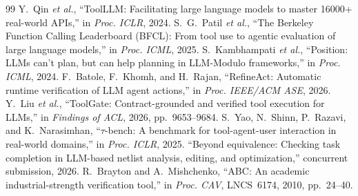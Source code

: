 \documentclass[conference,letterpaper]{IEEEtran}
\begin{document}
\begin{thebibliography}{99}
 Y.~Qin \emph{et al.}, ``ToolLLM: Facilitating large language models to master 16000+ real-world APIs,'' in \emph{Proc. ICLR}, 2024.
 S.~G.~Patil \emph{et al.}, ``The Berkeley Function Calling Leaderboard (BFCL): From tool use to agentic evaluation of large language models,'' in \emph{Proc. ICML}, 2025.
 S.~Kambhampati \emph{et al.}, ``Position: LLMs can't plan, but can help planning in LLM-Modulo frameworks,'' in \emph{Proc. ICML}, 2024.
 F.~Batole, F.~Khomh, and H.~Rajan, ``RefineAct: Automatic runtime verification of LLM agent actions,'' in \emph{Proc. IEEE/ACM ASE}, 2026.
 Y.~Liu \emph{et al.}, ``ToolGate: Contract-grounded and verified tool execution for LLMs,'' in \emph{Findings of ACL}, 2026, pp.~9653--9684.
 S.~Yao, N.~Shinn, P.~Razavi, and K.~Narasimhan, ``$\tau$-bench: A benchmark for tool-agent-user interaction in real-world domains,'' in \emph{Proc. ICLR}, 2025.
 ``Beyond equivalence: Checking task completion in LLM-based netlist analysis, editing, and optimization,'' concurrent submission, 2026.
 R.~Brayton and A.~Mishchenko, ``ABC: An academic industrial-strength verification tool,'' in \emph{Proc. CAV}, LNCS~6174, 2010, pp.~24--40.
\end{thebibliography}
\end{document}
